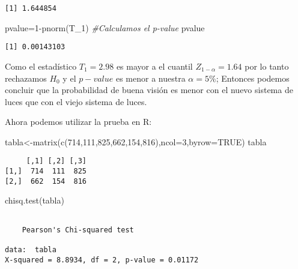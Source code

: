 \documentclass[
  a4paper,
  oneside,
  openany]{book}
\newenvironment{Shaded}{\begin{snugshade}}{\end{snugshade}}
\newcommand{\AttributeTok}[1]{\textcolor[rgb]{0.77,0.63,0.00}{#1}}
\newcommand{\CommentTok}[1]{\textcolor[rgb]{0.56,0.35,0.01}{\textit{#1}}}
\newcommand{\ConstantTok}[1]{\textcolor[rgb]{0.00,0.00,0.00}{#1}}
\newcommand{\DecValTok}[1]{\textcolor[rgb]{0.00,0.00,0.81}{#1}}
\newcommand{\FunctionTok}[1]{\textcolor[rgb]{0.00,0.00,0.00}{#1}}
\newcommand{\NormalTok}[1]{#1}
\newcommand{\OtherTok}[1]{\textcolor[rgb]{0.56,0.35,0.01}{#1}}
\newcommand{\SpecialCharTok}[1]{\textcolor[rgb]{0.00,0.00,0.00}{#1}}
\begin{document}
\begin{verbatim}
[1] 1.644854
\end{verbatim}

\begin{Shaded}
\begin{Highlighting}[]
\NormalTok{pvalue}\OtherTok{=}\DecValTok{1}\SpecialCharTok{{-}}\FunctionTok{pnorm}\NormalTok{(T\_1)  }\CommentTok{\#Calculamos el p{-}value}
\NormalTok{pvalue}
\end{Highlighting}
\end{Shaded}

\begin{verbatim}
[1] 0.00143103
\end{verbatim}

Como el estadístico \(T_1=2.98\) es mayor a el cuantil \(Z_{1-\alpha}=1.64\) por lo tanto rechazamos \(H_0\)
y el \(p-value\) es menor a nuestra \(\alpha=5\%\); Entonces podemos concluir que la probabilidad de buena visión es menor con el nuevo sistema de luces que con el viejo sistema de luces.

Ahora podemos utilizar la prueba en R:

\begin{Shaded}
\begin{Highlighting}[]
\NormalTok{tabla}\OtherTok{\textless{}{-}}\FunctionTok{matrix}\NormalTok{(}\FunctionTok{c}\NormalTok{(}\DecValTok{714}\NormalTok{,}\DecValTok{111}\NormalTok{,}\DecValTok{825}\NormalTok{,}\DecValTok{662}\NormalTok{,}\DecValTok{154}\NormalTok{,}\DecValTok{816}\NormalTok{),}\AttributeTok{ncol=}\DecValTok{3}\NormalTok{,}\AttributeTok{byrow=}\ConstantTok{TRUE}\NormalTok{)}
\NormalTok{tabla}
\end{Highlighting}
\end{Shaded}

\begin{verbatim}
     [,1] [,2] [,3]
[1,]  714  111  825
[2,]  662  154  816
\end{verbatim}

\begin{Shaded}
\begin{Highlighting}[]
\FunctionTok{chisq.test}\NormalTok{(tabla)}
\end{Highlighting}
\end{Shaded}

\begin{verbatim}

    Pearson's Chi-squared test

data:  tabla
X-squared = 8.8934, df = 2, p-value = 0.01172
\end{verbatim}
\end{document}
